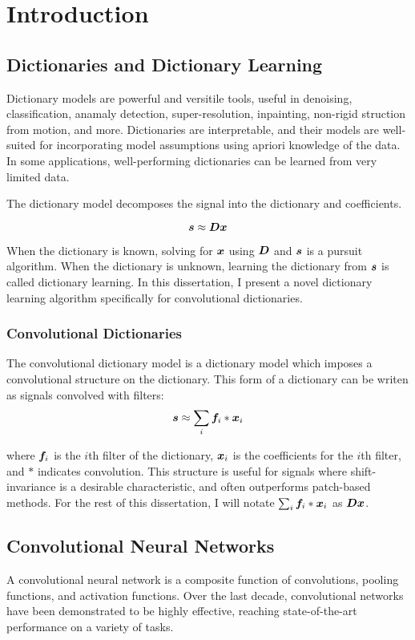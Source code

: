 \chapter{Introduction}


\section{Dictionaries and Dictionary Learning}
Dictionary models are powerful and versitile tools, useful in denoising, classification, anamaly detection, super-resolution, inpainting, non-rigid struction from motion, and more. Dictionaries are interpretable, and their models are well-suited for incorporating model assumptions using apriori knowledge of the data. In some applications, well-performing dictionaries can be learned from very limited data.

The dictionary model decomposes the signal into the dictionary and coefficients.

\begin{equation}
\bm{s} \approx \bm{D}\bm{x}
\end{equation}

When the dictionary is known, solving for $\bm{x}$ using $\bm{D}$ and $\bm{s}$ is a pursuit algorithm. When the dictionary is unknown, learning the dictionary from $\bm{s}$ is called dictionary learning. In this dissertation, I present a novel dictionary learning algorithm specifically for convolutional dictionaries.

\subsection{Convolutional Dictionaries}
The convolutional dictionary model is a dictionary model which imposes a convolutional structure on the dictionary. This form of a dictionary can be writen as signals convolved with filters:
\begin{equation}
\bm{s} \approx \sum_i \bm{f}_i * \bm{x}_i
\end{equation}

where $\bm{f}_i$ is the $i$th filter of the dictionary, $\bm{x}_i$ is the coefficients for the $i$th filter, and $*$ indicates convolution. This structure is useful for signals where shift-invariance is a desirable characteristic, and often outperforms patch-based methods. For the rest of this dissertation, I will notate $\sum_i \bm{f}_i * \bm{x}_i$ as $\bm{D}\bm{x}$.

\section{Convolutional Neural Networks}
A convolutional neural network is a composite function of convolutions, pooling functions, and activation functions. Over the last decade, convolutional networks have been demonstrated to be highly effective, reaching state-of-the-art performance on a variety of tasks.

